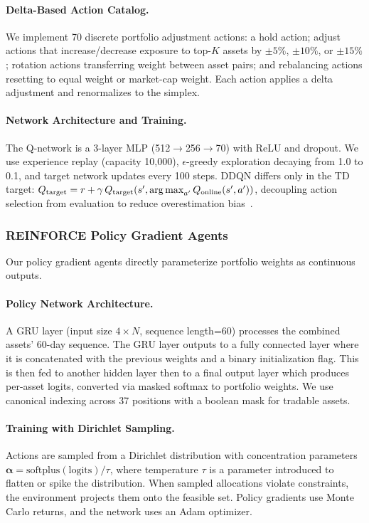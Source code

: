 \paragraph{Delta-Based Action Catalog.}
We implement 70 discrete portfolio adjustment actions: a hold action; adjust actions that increase/decrease exposure to top-$K$ assets by $\pm5\%$, $\pm10\%$, or $\pm15\%$; rotation actions transferring weight between asset pairs; and rebalancing actions resetting to equal weight or market-cap weight. Each action applies a delta adjustment and renormalizes to the simplex.

\paragraph{Network Architecture and Training.}
The Q-network is a 3-layer MLP (512$\rightarrow$256$\rightarrow$70) with ReLU and dropout. We use experience replay (capacity 10,000), $\epsilon$-greedy exploration decaying from 1.0 to 0.1, and target network updates every 100 steps. DDQN differs only in the TD target: $Q_{\text{target}} = r + \gamma \, Q_{\text{target}}(s', \operatorname*{arg\,max}_{a'} Q_{\text{online}}(s', a'))$, decoupling action selection from evaluation to reduce overestimation bias~\citep{vanHasselt2016ddqn}.

\subsubsection{REINFORCE Policy Gradient Agents} 
\label{sec:reinforce} 
Our policy gradient agents directly parameterize portfolio weights as continuous outputs. \paragraph{Policy Network Architecture.} A GRU layer (input size $4 \times N$, sequence length=60) processes the combined assets' 60-day sequence.  The GRU layer outputs to a fully connected layer where it is concatenated with the previous weights and a binary initialization flag.  This is then fed to another hidden layer then to a final output layer which produces per-asset logits, converted via masked softmax to portfolio weights. We use canonical indexing across 37 positions with a boolean mask for tradable assets. 
 
\paragraph{Training with Dirichlet Sampling.} Actions are sampled from a Dirichlet distribution with concentration parameters $\boldsymbol{\alpha} = \text{softplus}(\text{logits}) / \tau$, where temperature $\tau$ is a parameter introduced to flatten or spike the distribution. When sampled allocations violate constraints, the environment projects them onto the feasible set. Policy gradients use Monte Carlo returns, and the network uses an Adam optimizer.
 

